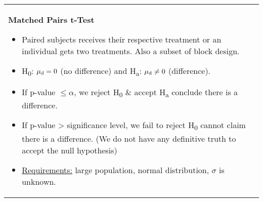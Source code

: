 \documentclass[6pt]{article}
\begin{document}
\begin{scriptsize}
\begin{tabular}{l | l}
{\begin{flushright}
\end{flushright}
\begin{normalsize}
\textbf{Matched Pairs t-Test}
\end{normalsize}
\begin{itemize}
\item Paired subjects receives their respective treatment or an individual gets two treatments. Also a subset of block design. 
\item H\textsubscript{0}: $\mu\textsubscript{d} = 0$ (no difference) and H\textsubscript{a}: $\mu\textsubscript{d} \ne 0$ (difference). 
\item If p-value $\le \alpha$, we reject H\textsubscript{0} \& accept H\textsubscript{a} conclude there is a difference. 
\item If p-value > significance level, we fail to reject H\textsubscript{0} cannot claim there is a difference. (We do not have any definitive truth to accept the null hypothesis)
\item \underline{Requirements:} large population, normal distribution, $\sigma$ is unknown. 
\end{itemize}
\begin{flushright}
\end{flushright}
}
\end{tabular}
\end{scriptsize}
\end{document}
